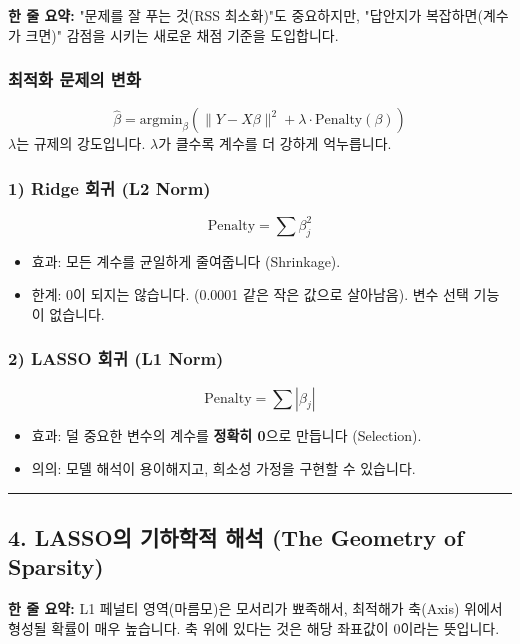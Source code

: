 \documentclass[11pt,a4paper]{book}
\theoremstyle{definition}
\begin{document}
\begin{conceptbox}[title={개념 3: 벌점(Penalty) 시스템}]
\textbf{한 줄 요약:} "문제를 잘 푸는 것(RSS 최소화)"도 중요하지만, "답안지가 복잡하면(계수가 크면)" 감점을 시키는 새로운 채점 기준을 도입합니다.
\end{conceptbox}

\subsubsection*{최적화 문제의 변화}
$$ \hat{\beta} = \text{argmin}_{\beta} \left( \|Y - X\beta\|^2 + \lambda \cdot \text{Penalty}(\beta) \right) $$
$\lambda$는 규제의 강도입니다. $\lambda$가 클수록 계수를 더 강하게 억누릅니다.

\subsubsection*{1) Ridge 회귀 (L2 Norm)}
$$ \text{Penalty} = \sum \beta_j^2 $$
\begin{itemize}
    \item 효과: 모든 계수를 균일하게 줄여줍니다 (Shrinkage).
    \item 한계: 0이 되지는 않습니다. (0.0001 같은 작은 값으로 살아남음). 변수 선택 기능이 없습니다.
\end{itemize}

\subsubsection*{2) LASSO 회귀 (L1 Norm)}
$$ \text{Penalty} = \sum |\beta_j| $$
\begin{itemize}
    \item 효과: 덜 중요한 변수의 계수를 \textbf{정확히 0}으로 만듭니다 (Selection).
    \item 의의: 모델 해석이 용이해지고, 희소성 가정을 구현할 수 있습니다.
\end{itemize}

\vspace{0.5cm}\hrule\vspace{0.5cm}

\subsection{4. LASSO의 기하학적 해석 (The Geometry of Sparsity)}

\begin{conceptbox}[title={개념 4: 둥근 원과 뾰족한 마름모}]
\textbf{한 줄 요약:} L1 페널티 영역(마름모)은 모서리가 뾰족해서, 최적해가 축(Axis) 위에서 형성될 확률이 매우 높습니다. 축 위에 있다는 것은 해당 좌표값이 0이라는 뜻입니다.
\end{conceptbox}
\end{document}
